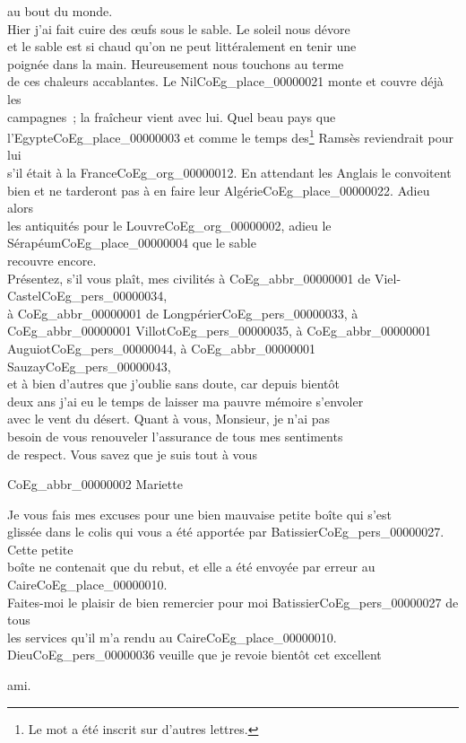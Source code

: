 \documentclass{book}
\begin{document}
au bout du monde.\\
\indent Hier j’ai fait cuire des œufs sous le sable. Le soleil nous dévore\\
et le sable est si chaud qu’on ne peut littéralement en tenir une\\
poignée dans la main. Heureusement nous touchons au terme\\
de ces chaleurs accablantes. Le Nil\gls{CoEg_place_00000021} monte et couvre déjà les\\
campagnes~; la fraîcheur vient avec lui. Quel beau pays que\\
l’Egypte\gls{CoEg_place_00000003} et comme le temps des\footnote{Le mot a été inscrit sur d'autres lettres.} Ramsès reviendrait pour lui\\
s’il était à la France\gls{CoEg_org_00000012}. En attendant les Anglais le convoitent\\
bien et ne tarderont pas à en faire leur Algérie\gls{CoEg_place_00000022}. Adieu alors\\
les antiquités pour le Louvre\gls{CoEg_org_00000002}, adieu le Sérapéum\gls{CoEg_place_00000004} que le sable\\
recouvre encore.\\
\indent Présentez, s’il vous plaît, mes civilités à \gls{CoEg_abbr_00000001} de Viel-Castel\gls{CoEg_pers_00000034},\\
à \gls{CoEg_abbr_00000001} de Longpérier\gls{CoEg_pers_00000033}, à \gls{CoEg_abbr_00000001} Villot\gls{CoEg_pers_00000035}, à \gls{CoEg_abbr_00000001} Auguiot\gls{CoEg_pers_00000044}, à \gls{CoEg_abbr_00000001} Sauzay\gls{CoEg_pers_00000043},\\
et à bien d’autres que j’oublie sans doute, car depuis bientôt\\
deux ans j’ai eu le temps de laisser ma pauvre mémoire s’envoler\\
avec le vent du désert. Quant à vous, Monsieur, je n’ai pas\\
besoin de vous renouveler l’assurance de tous mes sentiments\\
de respect. Vous savez que je suis tout à vous
\begin{center} \hspace{5cm}\gls{CoEg_abbr_00000002} Mariette\end{center}
Je vous fais mes excuses pour une bien mauvaise petite boîte qui s’est\\
glissée dans le colis qui vous a été apportée par Batissier\gls{CoEg_pers_00000027}. Cette petite\\
boîte ne contenait que du rebut, et elle a été envoyée par erreur au\\
Caire\gls{CoEg_place_00000010}.\\
\indent Faites-moi le plaisir de bien remercier pour moi Batissier\gls{CoEg_pers_00000027} de tous\\
les services qu’il m’a rendu au Caire\gls{CoEg_place_00000010}. Dieu\gls{CoEg_pers_00000036} veuille que je revoie bientôt cet excellent
\begin{flushright}ami.\end{flushright}
\end{document}
